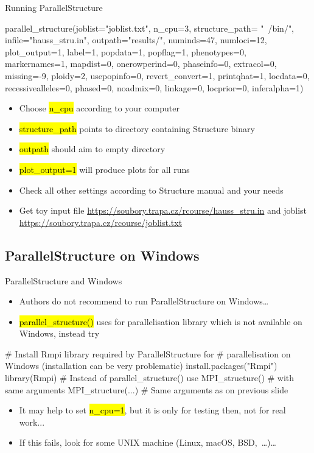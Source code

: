 \documentclass[compress, ucs, xelatex, 11pt, xcolor=svgnames,
	hyperref={
		bookmarks=true,
		unicode=true,
		colorlinks=true,
		pdftitle={Molecular data in R},
		plainpages=false,
		pdfauthor={Vojtech Zeisek},
		pdfsubject={Course about phylogeny and evolution in R},
		pdfcreator={XeLaTeX},
		pdfkeywords={R, evolution, phylogeny, molecular data},
		linkcolor=Tomato,
		anchorcolor=SaddleBrown,
		citecolor=Goldenrod,
		filecolor=DarkMagenta,
		menucolor=Sienna,
		urlcolor=DarkTurquoise,
		pdftex},
	url={hyphens, lowtilde} %
	]{beamer}
\renewcommand{\texttt}[1]{\hl{\ttfamily #1}}
\begin{document}
\begin{frame}[fragile]{Running ParallelStructure}
	\begin{spluscode}
    parallel_structure(joblist="joblist.txt", n_cpu=3, structure_path=
      "~/bin/", infile="hauss_stru.in", outpath="results/", numinds=47,
      numloci=12, plot_output=1, label=1, popdata=1, popflag=1,
      phenotypes=0, markernames=1, mapdist=0, onerowperind=0, phaseinfo=0,
      extracol=0, missing=-9, ploidy=2, usepopinfo=0, revert_convert=1,
      printqhat=1, locdata=0, recessivealleles=0, phased=0, noadmix=0,
      linkage=0, locprior=0, inferalpha=1)
	\end{spluscode}
	\begin{itemize}
		\item Choose \texttt{n\_cpu} according to your computer
		\item \texttt{structure\_path} points to \alert{directory} containing Structure binary
		\item \texttt{outpath} should aim to \alert{empty} directory
		\item \texttt{plot\_output=1} will produce plots for all runs
		\item Check all other settings according to Structure manual and your needs
		\item Get toy input file \url{https://soubory.trapa.cz/rcourse/hauss_stru.in} and joblist \url{https://soubory.trapa.cz/rcourse/joblist.txt}
	\end{itemize}
\end{frame}

\subsection{ParallelStructure on Windows}

\begin{frame}[fragile]{ParallelStructure and Windows}
	\begin{itemize}
		\item Authors do not recommend to run ParallelStructure on Windows\ldots
		\item \texttt{parallel\_structure()} uses for parallelisation library which is not available on Windows, instead try
	\end{itemize}
	\begin{spluscode}
    # Install Rmpi library required by ParallelStructure for
    # parallelisation on Windows (installation can be very problematic)
    install.packages("Rmpi")
    library(Rmpi)
    # Instead of parallel_structure() use MPI_structure()
    # with same arguments
    MPI_structure(...) # Same arguments as on previous slide
	\end{spluscode}
	\begin{itemize}
		\item It may help to set \texttt{n\_cpu=1}, but it is only for testing then, not for real work...
		\item If this fails, look for some UNIX machine (Linux, macOS, BSD,~\ldots)\ldots
	\end{itemize}
\end{frame}
\end{document}
